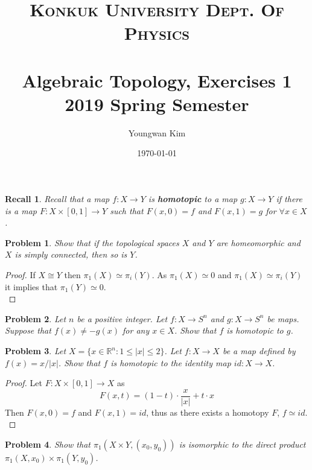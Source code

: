 \documentclass[paper=a4, fontsize=11pt]{scrartcl}
\title{	
	\normalfont \normalsize 
	\textsc{Konkuk University Dept. Of Physics} \\ [25pt] %
	\horrule{1pt} \\[0.4cm] 
	\huge Algebraic Topology, Exercises 1 \\
	\vspace{0.1in}
	\Large 2019 Spring Semester
	\horrule{1pt} \\[0.4cm] 
}
\author{Youngwan Kim}
\date{\normalsize\today}
\newtheorem*{recall}{Recall}
\newtheorem{problem}{Problem}
\begin{document}
	
\maketitle	

\begin{recall}
	Recall that a map $f:X \to Y $ is \textbf{homotopic} to a map $g:X\to Y$ if there is a map $F:X\times[0,1]\to Y$ such that $F(x,0)=f$ and $F(x,1)=g$ for $\forall x\in X$.\\
\end{recall}

\begin{problem}
	Show that if the topological spaces $X$ and $Y$ are homeomorphic and $X$ is simply connected, then so is $Y$.\\
\end{problem}


\begin{proof}
	If $X \cong Y $ then $\pi_1(X) \simeq \pi_i(Y)$. As $\pi_1(X) \simeq 0$ and $\pi_1(X) \simeq \pi_i(Y)$\, it implies that $\pi_1(Y) \simeq 0$.\\
\end{proof}

\begin{problem}
	Let $n$ be a positive integer. Let $f:X\to S^n$ and $g:X\to S^n$ be maps. Suppose that $f(x)\neq -g(x)$ for any $x \in X$. Show that $f$ is homotopic to $g$.\\
\end{problem}

\begin{problem}
	Let $X=\{x\in \mathbb{R}^n:1\leq |x| \leq 2\}$. Let $f:X\to X$ be a map defined by $f(x)=x/|x|$. Show that $f$ is homotopic to the identity map $id:X\to X$.\\
\end{problem}

\begin{proof}
	Let $F:X\times [0,1] \to X$ as 
	\begin{equation}\nonumber
		F(x,t) = (1-t) \cdot \frac{x}{|x|} + t \cdot x
	\end{equation}
	Then $F(x,0)=f$ and $F(x,1)=id$, thus as there exists a homotopy $F$, $f \simeq id$.\\
\end{proof}

\begin{problem}
	Show that $\pi_1(X\times Y,(x_0,y_0))$ is isomorphic to the direct product $\pi_1(X,x_0)\times\pi_1(Y,y_0)$.\\
\end{problem}
\end{document}
